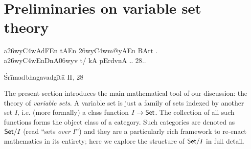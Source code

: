 \section{Preliminaries on variable set theory}
\epigraph{{\dn  a\326wy\3C4wAdFEn tAEn \326wy\3C4wm@yAEn BArt . \\
      a\326wy\3C4wEnDnA\306wy\?v t/ kA pErd\?vnA .. 28..}}
{Śrīmadbhagavadgītā II, 28}
The present section introduces the main mathematical tool of our discussion: the theory of \emph{variable sets}. A variable set is just a family of sets indexed by another set $I$, i.e. (more formally) a class function $I \to \mathsf{Set}$. The collection of all such functions forms the object class of a category. Such categories are denoted as $\mathsf{Set}/I$ (read ``sets \emph{over} $I$'') and they are a particularly rich framework to re-enact mathematics in its entirety; here we explore the structure of $\mathsf{Set}/I$ in full detail.

